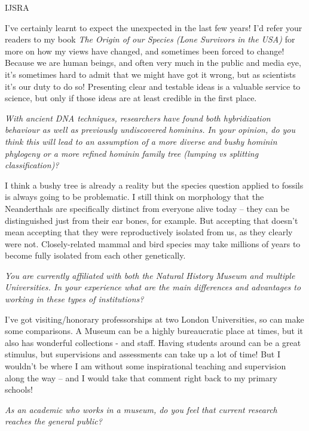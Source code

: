 \documentclass{ijsra}
\begin{document}
\begin{labeling}{IJSRA}
\item[CS]
I’ve certainly learnt to expect the unexpected in the last few years!
I’d refer your readers to my book \emph{The Origin of our Species (Lone Survivors in the USA)} for more on how my views have changed,
and sometimes been forced to change!
Because we are human beings, and often very much in the public and media eye, it’s sometimes hard to
admit that we might have got it wrong, but as scientists it’s our duty to do so!
Presenting clear and testable ideas is a valuable service to science, but only if those ideas are at least credible in the first place.

\item[IJSRA]
\emph{With ancient DNA techniques, researchers have found both hybridization behaviour as well as
previously undiscovered hominins.
In your opinion, do you think this will lead to an assumption of a more diverse and bushy hominin phylogeny or
a more refined hominin family tree (lumping vs splitting classification)?}

\item[CS]
I think a bushy tree is already a reality but the species question applied to fossils is always going to be problematic.
I still think on morphology that the Neanderthals are specifically distinct from everyone alive today – they can be
distinguished just from their ear bones, for example.
But accepting that doesn’t mean accepting that they were reproductively isolated from us, as they clearly were not.
Closely-related mammal and bird species may take millions of years to become fully isolated from each other genetically.

\item[IJSRA]
\emph{You are currently affiliated with both the Natural History Museum and multiple Universities.
In your experience what are the main differences and advantages to working in these types of institutions?}

\item[CS]
I’ve got visiting/honorary professorships at two London Universities, so can make some comparisons.
A Museum can be a highly bureaucratic place at times, but it also has wonderful collections - and staff.
Having students around can be a great stimulus, but supervisions and assessments can take up a lot of time!
But I wouldn’t be where I am without some inspirational teaching and supervision along the way – and
I would take that comment right back to my primary schools!

\item[IJSRA]
\emph{As an academic who works in a museum, do you feel that current research reaches the general public?}


\end{labeling}
\end{document}
